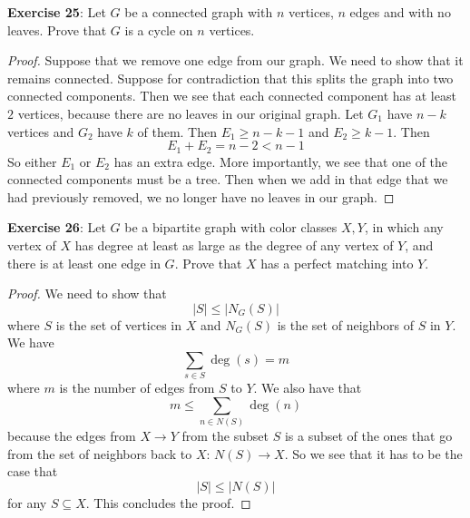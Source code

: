 \documentclass{article}
\begin{document}
\textbf{Exercise 25}: Let $G$ be a connected graph with $n$ vertices, $n$ edges and with no leaves. Prove that $G$ is a cycle on $n$ vertices. 
    \begin{proof}
        Suppose that we remove one edge from our graph. We need to show that it remains connected. Suppose for contradiction that this splits the graph into two connected components. Then we see that each connected component has at least $2$ vertices, because there are no leaves in our original graph. Let $G_{1}$ have $n - k$ vertices and $G_{2}$ have $k$ of them. Then $E_{1} \geq n - k - 1$ and $E_{2} \geq k - 1$. Then 
            \begin{equation*}
                E_{1} + E_{2} = n - 2 < n - 1
            \end{equation*}
        So either $E_{1}$ or $E_{2}$ has an extra edge. More importantly, we see that one of the connected components must be a tree. Then when we add in that edge that we had previously removed, we no longer have no leaves in our graph.
    \end{proof}

\textbf{Exercise 26}: Let $G$ be a bipartite graph with color classes $X, Y$, in which any vertex of $X$ has degree at least as large as the degree of any vertex of $Y$, and there is at least one edge in $G$. Prove that $X$ has a perfect matching into $Y$.
    \begin{proof}
        We need to show that
            \begin{equation*}
                \lvert S \rvert \leq \lvert N_{G}(S) \rvert
            \end{equation*}
        where $S$ is the set of vertices in $X$ and $N_{G}(S)$ is the set of neighbors of $S$ in $Y$. We have 
            \begin{equation*}
                \sum_{s \in S} \deg(s) = m
            \end{equation*}
        where $m$ is the number of edges from $S$ to $Y$. We also have that 
            \begin{equation*}
                m \leq \sum_{n \in N(S)} \deg(n)
            \end{equation*}
        because the edges from $X \rightarrow Y$ from the subset $S$ is a subset of the ones that go from the set of neighbors back to $X$: $N(S) \rightarrow X$. So we see that it has to be the case that 
            \begin{equation*}
                \lvert S \rvert \leq \lvert N(S) \rvert
            \end{equation*}
        for any $S \subseteq X$. This concludes the proof.
    \end{proof}
\end{document}

